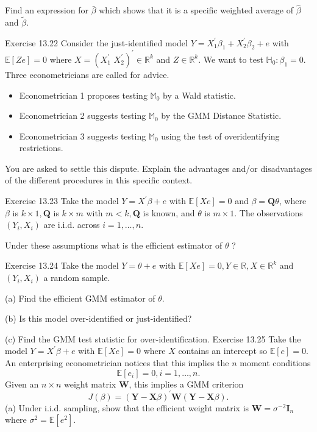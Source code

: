 \documentclass[10pt]{article}
\begin{document}
Find an expression for $\bar{\beta}$ which shows that it is a specific weighted average of $\widehat{\beta}$ and $\widetilde{\beta}$.

Exercise 13.22 Consider the just-identified model $Y=X_{1}^{\prime} \beta_{1}+X_{2}^{\prime} \beta_{2}+e$ with $\mathbb{E}[Z e]=0$ where $X=\left(X_{1}^{\prime}\right.$ $\left.X_{2}^{\prime}\right)^{\prime} \in \mathbb{R}^{k}$ and $Z \in \mathbb{R}^{k}$. We want to test $\mathbb{H}_{0}: \beta_{1}=0$. Three econometricians are called for advice.

\begin{itemize}
  \item Econometrician 1 proposes testing $\mathbb{M}_{0}$ by a Wald statistic.

  \item Econometrician 2 suggests testing $\mathbb{M}_{0}$ by the GMM Distance Statistic.

  \item Econometrician 3 suggests testing $\mathbb{M}_{0}$ using the test of overidentifying restrictions.

\end{itemize}
You are asked to settle this dispute. Explain the advantages and/or disadvantages of the different procedures in this specific context.

Exercise 13.23 Take the model $Y=X^{\prime} \beta+e$ with $\mathbb{E}[X e]=0$ and $\beta=\boldsymbol{Q} \theta$, where $\beta$ is $k \times 1, \boldsymbol{Q}$ is $k \times m$ with $m<k, \boldsymbol{Q}$ is known, and $\theta$ is $m \times 1$. The observations $\left(Y_{i}, X_{i}\right)$ are i.i.d. across $i=1, \ldots, n$.

Under these assumptions what is the efficient estimator of $\theta$ ?

Exercise 13.24 Take the model $Y=\theta+e$ with $\mathbb{E}[X e]=0, Y \in \mathbb{R}, X \in \mathbb{R}^{k}$ and $\left(Y_{i}, X_{i}\right)$ a random sample.

(a) Find the efficient GMM estimator of $\theta$.

(b) Is this model over-identified or just-identified?

(c) Find the GMM test statistic for over-identification. Exercise 13.25 Take the model $Y=X^{\prime} \beta+e$ with $\mathbb{E}[X e]=0$ where $X$ contains an intercept so $\mathbb{E}[e]=0$. An enterprising econometrician notices that this implies the $n$ moment conditions
$$
\mathbb{E}\left[e_{i}\right]=0, i=1, \ldots, n .
$$
Given an $n \times n$ weight matrix $\boldsymbol{W}$, this implies a GMM criterion
$$
J(\beta)=(\boldsymbol{Y}-\boldsymbol{X} \beta)^{\prime} \boldsymbol{W}(\boldsymbol{Y}-\boldsymbol{X} \beta) .
$$
(a) Under i.i.d. sampling, show that the efficient weight matrix is $\boldsymbol{W}=\sigma^{-2} \boldsymbol{I}_{n}$ where $\sigma^{2}=\mathbb{E}\left[e^{2}\right]$.
\end{document}
